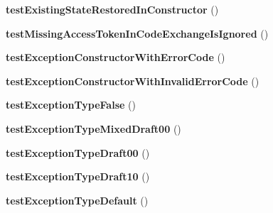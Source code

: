 \begin{DoxyCompactItemize}
\item 
\hypertarget{class_p_h_p_s_d_k_test_case_a08f166ba874e6a3c3d8e1b09bcce2e09}{{\bfseries test\-Existing\-State\-Restored\-In\-Constructor} ()}\label{class_p_h_p_s_d_k_test_case_a08f166ba874e6a3c3d8e1b09bcce2e09}

\item 
\hypertarget{class_p_h_p_s_d_k_test_case_a532c7d423440273aa34a24054d4f73df}{{\bfseries test\-Missing\-Access\-Token\-In\-Code\-Exchange\-Is\-Ignored} ()}\label{class_p_h_p_s_d_k_test_case_a532c7d423440273aa34a24054d4f73df}

\item 
\hypertarget{class_p_h_p_s_d_k_test_case_a9c0fbef30a3ca9abb5f9425c8f408b31}{{\bfseries test\-Exception\-Constructor\-With\-Error\-Code} ()}\label{class_p_h_p_s_d_k_test_case_a9c0fbef30a3ca9abb5f9425c8f408b31}

\item 
\hypertarget{class_p_h_p_s_d_k_test_case_ae6b499dd8fa64df4bd83f17527028115}{{\bfseries test\-Exception\-Constructor\-With\-Invalid\-Error\-Code} ()}\label{class_p_h_p_s_d_k_test_case_ae6b499dd8fa64df4bd83f17527028115}

\item 
\hypertarget{class_p_h_p_s_d_k_test_case_ae7142f5140cf35b0b2b6c7bbae887dc6}{{\bfseries test\-Exception\-Type\-False} ()}\label{class_p_h_p_s_d_k_test_case_ae7142f5140cf35b0b2b6c7bbae887dc6}

\item 
\hypertarget{class_p_h_p_s_d_k_test_case_a93db7a296bbde8280d66416e7b11e921}{{\bfseries test\-Exception\-Type\-Mixed\-Draft00} ()}\label{class_p_h_p_s_d_k_test_case_a93db7a296bbde8280d66416e7b11e921}

\item 
\hypertarget{class_p_h_p_s_d_k_test_case_a0e4c502cc3774d95552c77606e0667f3}{{\bfseries test\-Exception\-Type\-Draft00} ()}\label{class_p_h_p_s_d_k_test_case_a0e4c502cc3774d95552c77606e0667f3}

\item 
\hypertarget{class_p_h_p_s_d_k_test_case_a1fffd67ddf0c75b1e803d2320ff69166}{{\bfseries test\-Exception\-Type\-Draft10} ()}\label{class_p_h_p_s_d_k_test_case_a1fffd67ddf0c75b1e803d2320ff69166}

\item 
\hypertarget{class_p_h_p_s_d_k_test_case_adac9c8bf07a394f4ab7701db1ea7d665}{{\bfseries test\-Exception\-Type\-Default} ()}\label{class_p_h_p_s_d_k_test_case_adac9c8bf07a394f4ab7701db1ea7d665}


\end{DoxyCompactItemize}
